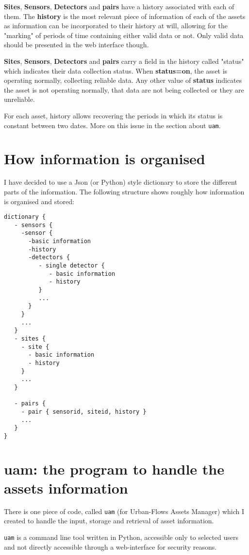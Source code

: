 \documentclass[12pt]{amsart}
\begin{document}
{\bf Sites}, {\bf Sensors}, {\bf Detectors} and {\bf pairs}  have a history associated with each of them.  The {\bf history} is the most relevant piece of information of each of the assets as information can be incorporated to their history at will, allowing for the "marking" of periods of time containing either valid data or not. Only valid data should be presented in the web interface though.

{\bf Sites}, {\bf Sensors}, {\bf Detectors} and {\bf pairs}  carry a field in the history called "status" which indicates their data collection status. When {\bf status=on}, the asset is operating normally, collecting reliable data. Any other value of {\bf status}  indicates the asset is not operating normally, that data are not being collected or they are unreliable.

For each asset, history allows recovering the periods in which  its status is constant between two dates. More on this issue in the section about {\tt uam}.


\section{How information is organised}

I have decided to use a Json (or Python) style dictionary to store the different parts of the information. The following structure shows roughly how information is organised and  stored:

\begin{verbatim}
dictionary {
   - sensors {
     -sensor {  
       -basic information
       -history
       -detectors {
          - single detector {
             - basic information
             - history
          }
          ...
       }
     }
     ...
   }
   - sites {
     - site {
       - basic information
       - history
     }
     ...
   }

   - pairs {
     - pair { sensorid, siteid, history }
     ...
   }
}  
\end{verbatim}

\section{uam: the  program to handle the assets information}

There is one piece of code, called {\tt uam} (for Urban-Flows Assets Manager) which I created to handle the input, storage and retrieval of asset information.

{\tt uam} is a command line tool written in Python, accessible only to selected users and not directly accessible through a web-interface for security reasons.
\end{document}

